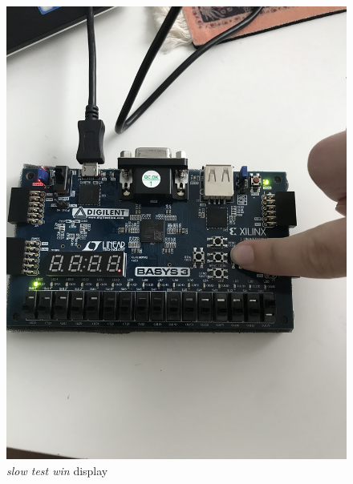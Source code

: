 \documentclass[11pt]{article}
\begin{document}
\begin{figure}[ht]\centering
	\includegraphics[angle = 270, width=1\textwidth]{slow1}
	\caption{\textit{slow test win} display}
	\label{fig:sim_with_table}
\end{figure}
\end{document}
